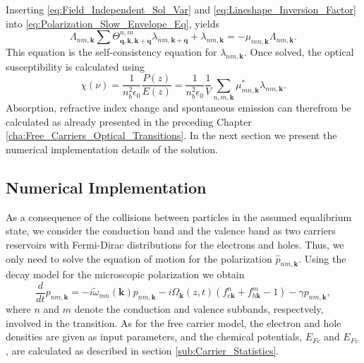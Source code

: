Inserting \ref{eq:Field_Independent_Sol_Var} and \ref{eq:Lineshape_Inversion_Factor}
into \ref{eq:Polarization_Slow_Envelope_Eq}, yields\begin{equation}
\Lambda_{nm,\mathbf{k}}\sum\Theta_{\mathbf{q},\mathbf{k},\mathbf{k}+\mathbf{q}}^{n,m}\lambda_{nm,\mathbf{k}+\mathbf{q}}+\lambda_{nm,\mathbf{k}}=-\mu_{mn,\mathbf{k}}\Lambda_{nm,\mathbf{k}}.\end{equation}
This equation is the self-consistency equation for $\lambda_{nm,\mathbf{k}}$.
Once solved, the optical susceptibility is calculated using\begin{equation}
\chi(\nu)=\frac{1}{n_{b}^{2}\epsilon_{0}}\frac{P(z)}{E(z)}=\frac{1}{n_{b}^{2}\epsilon_{0}}\frac{1}{V}\sum_{n,m,\mathbf{k}}\mu_{mn,\mathbf{k}}^{*}\lambda_{nm,\mathbf{k}}.\label{eq:HF_Susceptability}\end{equation}
Absorption, refractive index change and spontaneous emission can therefrom
be calculated as already presented in the preceding Chapter \ref{cha:Free_Carriers_Optical_Transitions}.
In the next section we present the numerical implementation details
of the solution. 


\subsection{Numerical Implementation}

As a consequence of the collisions between particles in the assumed
equalibrium state, we consider the conduction band and the valence
band as two carriers reservoirs with Fermi-Dirac distributions for
the electrons and holes. Thus, we only need to solve the equation
of motion for the polarization $\hat{p}_{nm,\mathbf{k}}$. Using the
decay model for the microscopic polarization we obtain\begin{equation}
\frac{d}{dt}p_{nm,\mathbf{k}}=-i\tilde{\omega}_{mn}(\mathbf{k})p_{nm,\mathbf{k}}-i\Omega_{\mathbf{k}}(z,t)\left(f_{e\mathbf{k}}^{n}+f_{h\mathbf{k}}^{m}-1\right)-\gamma p_{nm,\mathbf{k}},\label{eq:HF_Polarization_Eq_Motion_Numerics}\end{equation}
where $n$ and $m$ denote the conduction and valence subbands, respectvely,
involved in the transition. As for the free carrier model, the electron
and hole densities are given as input parameters, and the chemical
potentials, $E_{Fc}$ and $E_{Fv}$, are calculated as described in
section \ref{sub:Carrier_Statistics}. 

